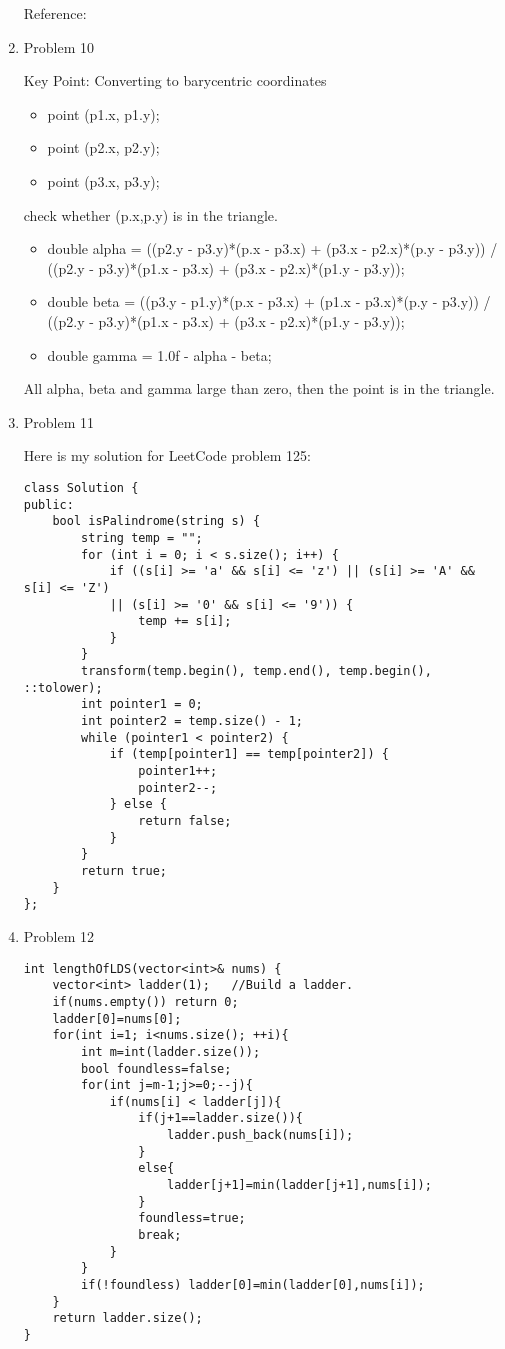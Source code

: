 \documentclass[10pt, onecolumn, draftcls]{IEEEtran}
\begin{document}
\begin{enumerate}
Reference: \cite{ets} \cite{tsa}

\item Problem 10

Key Point: Converting to barycentric coordinates
\begin{itemize}
\item point (p1.x, p1.y);
\item point (p2.x, p2.y);
\item point (p3.x, p3.y);
\end{itemize}
check whether (p.x,p.y) is in the triangle.

\begin{itemize}
\item double alpha = ((p2.y - p3.y)*(p.x - p3.x) + (p3.x - p2.x)*(p.y - p3.y)) /
            ((p2.y - p3.y)*(p1.x - p3.x) + (p3.x - p2.x)*(p1.y - p3.y));
\item double beta = ((p3.y - p1.y)*(p.x - p3.x) + (p1.x - p3.x)*(p.y - p3.y)) /
            ((p2.y - p3.y)*(p1.x - p3.x) + (p3.x - p2.x)*(p1.y - p3.y));
\item double gamma = 1.0f - alpha - beta;
\end{itemize}

All alpha, beta and gamma large than zero, then the point is in the triangle.

\item Problem 11

Here is my solution for LeetCode problem 125:

\begin{lstlisting}
class Solution {
public:
    bool isPalindrome(string s) {
        string temp = "";
        for (int i = 0; i < s.size(); i++) {
            if ((s[i] >= 'a' && s[i] <= 'z') || (s[i] >= 'A' && s[i] <= 'Z') 
            || (s[i] >= '0' && s[i] <= '9')) {
                temp += s[i];
            }
        }
        transform(temp.begin(), temp.end(), temp.begin(), ::tolower);
        int pointer1 = 0;
        int pointer2 = temp.size() - 1;
        while (pointer1 < pointer2) {
            if (temp[pointer1] == temp[pointer2]) {
                pointer1++;
                pointer2--;
            } else {
                return false;
            }
        }
        return true;
    }
};
\end{lstlisting}

\item
Problem 12
\begin{lstlisting}
int lengthOfLDS(vector<int>& nums) {
    vector<int> ladder(1);   //Build a ladder.
    if(nums.empty()) return 0;
    ladder[0]=nums[0];
    for(int i=1; i<nums.size(); ++i){
        int m=int(ladder.size());
        bool foundless=false;
        for(int j=m-1;j>=0;--j){
            if(nums[i] < ladder[j]){
                if(j+1==ladder.size()){
                    ladder.push_back(nums[i]);
                }
                else{
                    ladder[j+1]=min(ladder[j+1],nums[i]);
                }
                foundless=true;
                break;
            }
        }
        if(!foundless) ladder[0]=min(ladder[0],nums[i]);
    }
    return ladder.size();
}
\end{lstlisting}


\end{enumerate}
\end{document}
